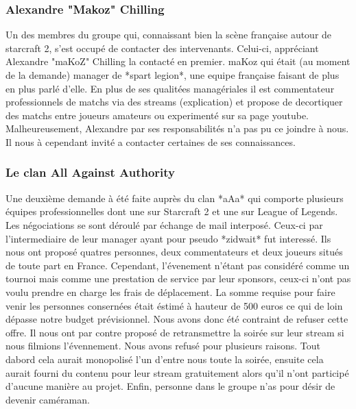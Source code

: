 \subsubsection{Alexandre "Makoz" Chilling}%
\label{ssub:alexandre_makoz_chilling}

Un des membres du groupe qui, connaissant bien la scène française autour
de starcraft 2, s'est occupé de contacter des intervenants.  Celui-ci,
appréciant Alexandre "maKoZ" Chilling la contacté en premier.  maKoz qui
était (au moment de la demande) manager de *spart legion*, une equipe
française faisant de plus en plus parlé d'elle. En plus de ses qualitées
managériales il est commentateur professionnels de matchs via des
streams (explication) et propose de decortiquer des matchs entre joueurs
amateurs ou experimenté sur sa page youtube. Malheureusement, Alexandre
par ses responsabilités n'a pas pu ce joindre à nous. Il nous à
cependant invité a contacter certaines de ses connaissances.

\subsubsection{Le clan All Against Authority}%
\label{ssub:le_clan_all_against_authority}

Une deuxième demande à été faite auprès du clan *aAa* qui comporte
plusieurs équipes professionnelles dont une sur Starcraft 2 et une sur
League of Legends. Les négociations se sont déroulé par échange de mail
interposé.  Ceux-ci par l'intermediaire de leur manager ayant pour
pseudo *zidwait* fut interessé. Ils nous ont proposé quatres personnes,
deux commentateurs et deux joueurs situés de toute part en France.
Cependant, l'évenement n'étant pas considéré comme un tournoi mais comme
une prestation de service par leur sponsors, ceux-ci n'ont pas voulu
prendre en charge les frais de déplacement. La somme requise pour faire
venir les personnes consernées était éstimé à hauteur de 500 euros ce
qui de loin dépasse notre budget prévisionnel. Nous avons donc été
contraint de refuser cette offre. Il nous ont par contre proposé de
retransmettre la soirée sur leur stream si nous filmions l'évennement.
Nous avons refusé pour plusieurs raisons. Tout dabord cela aurait
monopolisé l'un d'entre nous toute la soirée, ensuite cela aurait fourni
du contenu pour leur stream gratuitement alors qu'il n'ont participé
d'aucune manière au projet. Enfin, personne dans le groupe n'as pour
désir de devenir caméraman.

